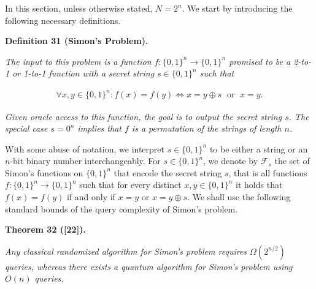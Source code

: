 \documentclass[10pt,a4paper]{article}
\begin{document}
In this section, unless otherwise stated, $N=2^{n}$.
We start by introducing the following necessary definitions.\par





\par\medskip\noindent\textbf{
\textbf{Definition 31}\textbf{ }(Simon’s Problem)\textbf{.}
}\par



\emph{The input to this problem is a function $f:\{0,1\}^{n}\rightarrow\{0,1\}^{n}$ promised to be a 2-to-1 or 1-to-1 function with a secret string $s\in\{0,1\}^{n}$ such that}\par


\[\begin{gathered}
\forall x,y\in\{0,1\}^{n}:f(x)=f(y)\iff x=y\oplus s\;\text{ or }\;x=y.
\end{gathered}\]


\emph{Given oracle access to this function, the goal is to output the secret string $s$. The special case $s=0^{n}$ implies that $f$ is a permutation of the strings of length $n$.}\par






With some abuse of notation, we interpret $s\in\{0,1\}^{n}$ to be either a string or an $n$-bit binary number interchangeably. For $s\in\{0,1\}^{n}$, we denote by $\mathcal{F}_{s}$ the set of Simon’s functions on $\{0,1\}^{n}$ that encode the secret string $s$, that is all functions $f:\{0,1\}^{n}\rightarrow\{0,1\}^{n}$ such that for every distinct $x,y\in\{0,1\}^{n}$ it holds that $f(x)=f(y)$ if and only if $x=y$ or $x=y\oplus s$. We shall use the following standard bounds of the query complexity of Simon’s problem.\par





\par\medskip\noindent\textbf{
\textbf{Theorem 32}\textbf{ }([22])\textbf{.}
}\par



\emph{Any classical randomized algorithm for Simon’s problem requires $\Omega(2^{n/2})$ queries, whereas there exists a quantum algorithm for Simon’s problem using $O(n)$ queries.}\par
\end{document}
